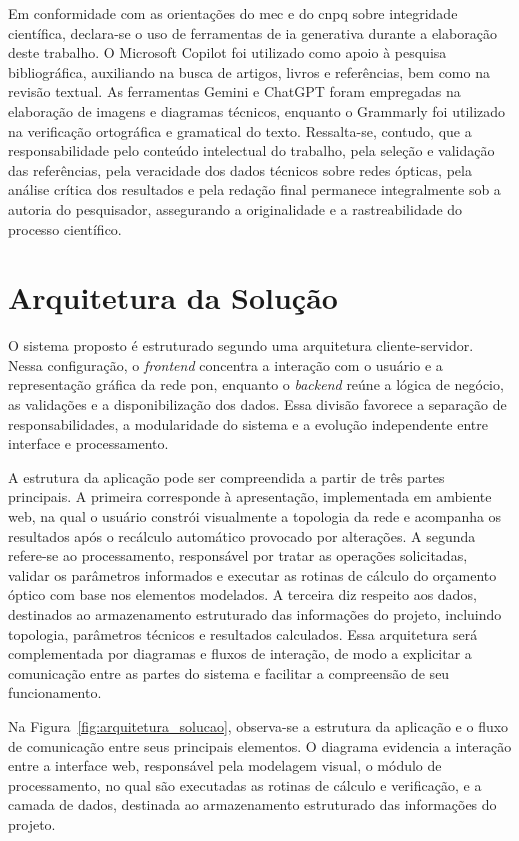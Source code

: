 Em conformidade com as orientações do \gls{mec} e do \gls{cnpq} sobre integridade científica, declara-se o uso de ferramentas de \gls{ia} generativa durante a elaboração deste trabalho. O Microsoft Copilot foi utilizado como apoio à pesquisa bibliográfica, auxiliando na busca de artigos, livros e referências, bem como na revisão textual. As ferramentas Gemini e ChatGPT foram empregadas na elaboração de imagens e diagramas técnicos, enquanto o Grammarly foi utilizado na verificação ortográfica e gramatical do texto. Ressalta-se, contudo, que a responsabilidade pelo conteúdo intelectual do trabalho, pela seleção e validação das referências, pela veracidade dos dados técnicos sobre redes ópticas, pela análise crítica dos resultados e pela redação final permanece integralmente sob a autoria do pesquisador, assegurando a originalidade e a rastreabilidade do processo científico.

\section{Arquitetura da Solução}

O sistema proposto é estruturado segundo uma arquitetura cliente-servidor. Nessa configuração, o \textit{frontend} concentra a interação com o usuário e a representação gráfica da rede \gls{pon}, enquanto o \textit{backend} reúne a lógica de negócio, as validações e a disponibilização dos dados. Essa divisão favorece a separação de responsabilidades, a modularidade do sistema e a evolução independente entre interface e processamento.

A estrutura da aplicação pode ser compreendida a partir de três partes principais. A primeira corresponde à apresentação, implementada em ambiente web, na qual o usuário constrói visualmente a topologia da rede e acompanha os resultados após o recálculo automático provocado por alterações. A segunda refere-se ao processamento, responsável por tratar as operações solicitadas, validar os parâmetros informados e executar as rotinas de cálculo do orçamento óptico com base nos elementos modelados. A terceira diz respeito aos dados, destinados ao armazenamento estruturado das informações do projeto, incluindo topologia, parâmetros técnicos e resultados calculados. Essa arquitetura será complementada por diagramas e fluxos de interação, de modo a explicitar a comunicação entre as partes do sistema e facilitar a compreensão de seu funcionamento.

Na Figura~\ref{fig:arquitetura_solucao}, observa-se a estrutura da aplicação e o fluxo de comunicação entre seus principais elementos. O diagrama evidencia a interação entre a interface web, responsável pela modelagem visual, o módulo de processamento, no qual são executadas as rotinas de cálculo e verificação, e a camada de dados, destinada ao armazenamento estruturado das informações do projeto.

